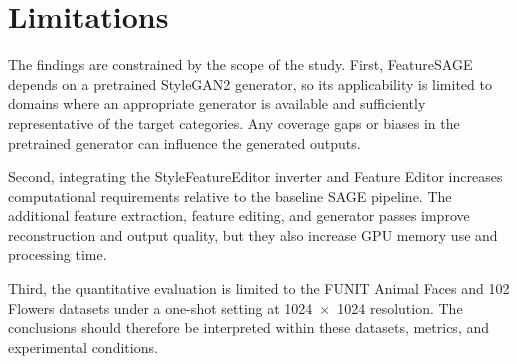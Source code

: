 \section{Limitations}

The findings are constrained by the scope of the study. First, FeatureSAGE depends on a pretrained StyleGAN2 generator, so its applicability is limited to domains where an appropriate generator is available and sufficiently representative of the target categories. Any coverage gaps or biases in the pretrained generator can influence the generated outputs.

Second, integrating the StyleFeatureEditor inverter and Feature Editor increases computational requirements relative to the baseline SAGE pipeline. The additional feature extraction, feature editing, and generator passes improve reconstruction and output quality, but they also increase GPU memory use and processing time.

Third, the quantitative evaluation is limited to the FUNIT Animal Faces and 102 Flowers datasets under a one-shot setting at 1024~\(\times\)~1024 resolution. The conclusions should therefore be interpreted within these datasets, metrics, and experimental conditions.
